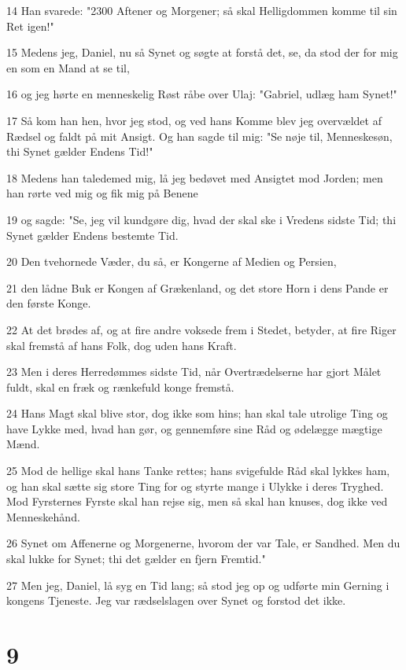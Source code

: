 \par 14 Han svarede: "2300 Aftener og Morgener; så skal Helligdommen komme til sin Ret igen!"
\par 15 Medens jeg, Daniel, nu så Synet og søgte at forstå det, se, da stod der for mig en som en Mand at se til,
\par 16 og jeg hørte en menneskelig Røst råbe over Ulaj: "Gabriel, udlæg ham Synet!"
\par 17 Så kom han hen, hvor jeg stod, og ved hans Komme blev jeg overvældet af Rædsel og faldt på mit Ansigt. Og han sagde til mig: "Se nøje til, Menneskesøn, thi Synet gælder Endens Tid!"
\par 18 Medens han taledemed mig, lå jeg bedøvet med Ansigtet mod Jorden; men han rørte ved mig og fik mig på Benene
\par 19 og sagde: "Se, jeg vil kundgøre dig, hvad der skal ske i Vredens sidste Tid; thi Synet gælder Endens bestemte Tid.
\par 20 Den tvehornede Væder, du så, er Kongerne af Medien og Persien,
\par 21 den lådne Buk er Kongen af Grækenland, og det store Horn i dens Pande er den første Konge.
\par 22 At det brødes af, og at fire andre voksede frem i Stedet, betyder, at fire Riger skal fremstå af hans Folk, dog uden hans Kraft.
\par 23 Men i deres Herredømmes sidste Tid, når Overtrædelserne har gjort Målet fuldt, skal en fræk og rænkefuld konge fremstå.
\par 24 Hans Magt skal blive stor, dog ikke som hins; han skal tale utrolige Ting og have Lykke med, hvad han gør, og gennemføre sine Råd og ødelægge mægtige Mænd.
\par 25 Mod de hellige skal hans Tanke rettes; hans svigefulde Råd skal lykkes ham, og han skal sætte sig store Ting for og styrte mange i Ulykke i deres Tryghed. Mod Fyrsternes Fyrste skal han rejse sig, men så skal han knuses, dog ikke ved Menneskehånd.
\par 26 Synet om Affenerne og Morgenerne, hvorom der var Tale, er Sandhed. Men du skal lukke for Synet; thi det gælder en fjern Fremtid."
\par 27 Men jeg, Daniel, lå syg en Tid lang; så stod jeg op og udførte min Gerning i kongens Tjeneste. Jeg var rædselslagen over Synet og forstod det ikke.

\chapter{9}

